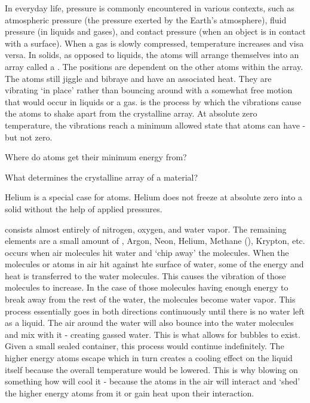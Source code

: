 In everyday life, pressure is commonly encountered in various contexts, such as atmospheric pressure (the pressure exerted by the Earth's atmosphere), fluid pressure (in liquids and gases), and contact pressure (when an object is in contact with a surface). When a gas is slowly compressed, temperature increases and visa versa. In solids, as opposed to liquids, the atoms will arrange themselves into an array called a . The positions are dependent on the other atoms within the array. The atoms still jiggle and bibraye and have an associated heat. They are vibrating `in place' rather than bouncing around with a somewhat free motion that would occur in liquids or a gas.  is the process by which the vibrations cause the atoms to shake apart from the crystalline array. At absolute zero temperature, the vibrations reach a minimum allowed state that atoms can have - but not zero. 

\begin{questions}
	\item Where do atoms get their minimum energy from?
	\item What determines the crystalline array of a material?
\end{questions}

\begin{interestnote}
	Helium is a special case for atoms. Helium does not freeze at absolute zero into a solid without the help of applied pressures. 
\end{interestnote}

 consists almost entirely of nitrogen, oxygen, and water vapor. The remaining elements are a small amount of , Argon, Neon, Helium, Methane (), Krypton, etc.  occurs when air molecules hit water and `chip away' the  molecules. When the molecules or atoms in air hit against hte surface of water, some of the energy and heat is transferred to the water molecules. This causes the vibration of those molecules to increase. In the case of those molecules having enough energy to break away from the rest of the water, the molecules become water vapor. This process essentially goes in both directions continuously until there is no water left as a liquid. The air around the water will also bounce into the water molecules and mix with it - creating gassed water. This is what allows for bubbles to exist. Given a small sealed container, this process would continue indefinitely. The higher energy atoms escape which in turn creates a cooling effect on the liquid itself because the overall temperature would be lowered. This is why blowing on something how will cool it - because the atoms in the air will interact and `shed' the higher energy atoms from it or gain heat upon their interaction. 

